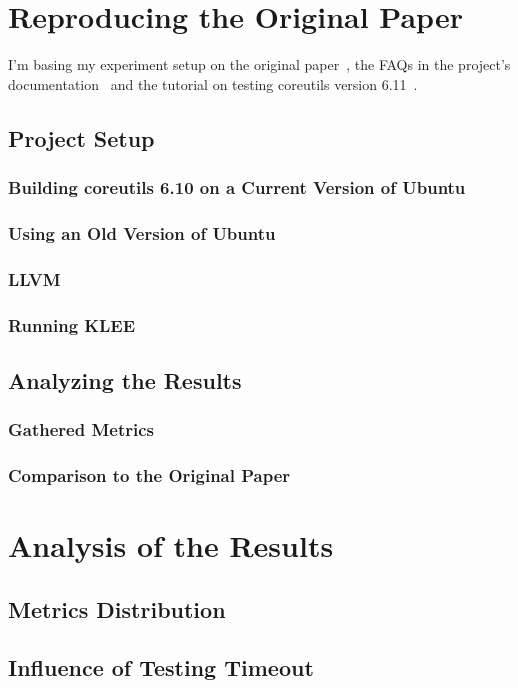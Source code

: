 \documentclass{article}
\let\savedCite=\cite
\renewcommand{\cite}{\unskip~\savedCite}
\begin{document}
\begin{multicols}{2}
    \section{Reproducing the Original Paper}
    \label{Reproducing}
    I'm basing my experiment setup on the original paper\cite{KLEE}, the FAQs in the project's documentation\cite{KLEEFAQ} and the tutorial on testing coreutils version 6.11\cite{KLEETutorial}.

    \subsection{Project Setup}
    \subsubsection{Building coreutils 6.10 on a Current Version of Ubuntu}
    \subsubsection{Using an Old Version of Ubuntu}
    \subsubsection{LLVM}
    \subsubsection{Running KLEE}

    \subsection{Analyzing the Results}
    \subsubsection{Gathered Metrics}
    \subsubsection{Comparison to the Original Paper}

    \section{Analysis of the Results}
    \label{Timeouts}
    \subsection{Metrics Distribution}
    \subsection{Influence of Testing Timeout}


\end{multicols}
\end{document}
